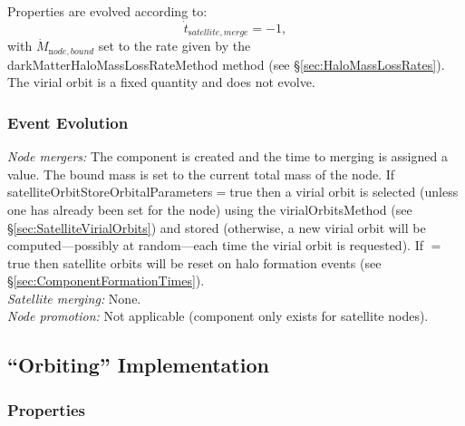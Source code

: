 Properties are evolved according to:
\begin{equation}
 \dot{t}_{\mathrm satellite, merge} = -1,
\end{equation}
with $\dot{M}_{\mathrm node,bound}$ set to the rate given by the {\normalfont \ttfamily darkMatterHaloMassLossRateMethod} method (see \S\ref{sec:HaloMassLossRates}). The virial orbit is a fixed quantity and does not evolve.

\subsubsection{Event Evolution}

\noindent\emph{Node mergers:} The \gls{component} is created and the time to merging is assigned a value. The bound mass is set to the current total mass of the node. If {\normalfont \ttfamily satelliteOrbitStoreOrbitalParameters}$=${\normalfont \ttfamily true} then a virial orbit is selected (unless one has already been set for the node) using the {\normalfont \ttfamily virialOrbitsMethod} (see \S\ref{sec:SatelliteVirialOrbits}) and stored (otherwise, a new virial orbit will be computed---possibly at random---each time the virial orbit is requested). If {\normalfont \ttfamily [satelliteOrbitResetOnHaloFormation]}$=${\normalfont \ttfamily true} then satellite orbits will be reset on halo formation events (see \S\ref{sec:ComponentFormationTimes}).\\

\noindent\emph{Satellite merging:} None.\\

\noindent\emph{Node promotion:} Not applicable (component only exists for satellite nodes).\\

\subsection{``Orbiting'' Implementation}\label{sec:ComponentSatelliteOrbiting}

\subsubsection{Properties}

